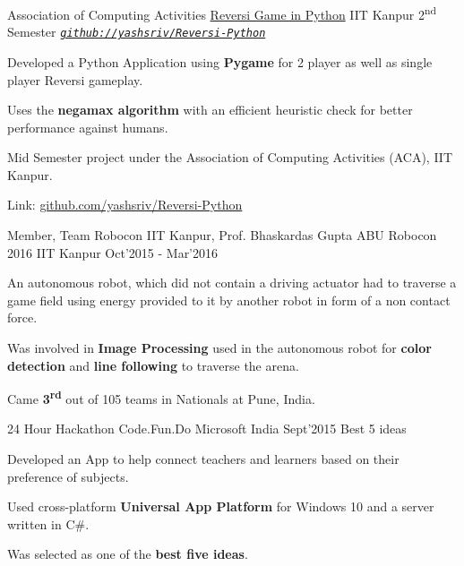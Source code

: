 \begin{cventries}
  \smallcventry
  {Association of Computing Activities}
  {\href{https://github.com/yashsriv/Reversi-Python}{Reversi Game in Python}}
  {IIT Kanpur}
  {2\textsuperscript{nd} Semester}
  {\emph{\texttt{\href{https://github.com/yashsriv/Reversi-Python}{github://yashsriv/Reversi-Python}}}}
  {
    \begin{cvitems}
    \item Developed a Python Application using \textbf{Pygame} for 2 player as well as
      single player Reversi gameplay.
    \item Uses the \textbf{negamax algorithm} with an efficient heuristic check
      for better performance against humans.
    \item Mid Semester project under the Association of Computing Activities (ACA), IIT Kanpur.
    \item Link: \href{https://github.com/yashsriv/Reversi-Python}{github.com/yashsriv/Reversi-Python}
    \end{cvitems}
  }

  \cventry
  {Member, Team Robocon IIT Kanpur\ifdefined\ONEPAGE\else, Prof. Bhaskardas Gupta\fi}
  {ABU Robocon 2016}
  {IIT Kanpur}
  {Oct'2015 - Mar'2016}
  {
    \begin{cvitems}
      \item An autonomous robot, which did not contain a driving actuator had to
        traverse a game field using energy provided to it by another robot in
        form of a non contact force.
      \item Was involved in \textbf{Image Processing} used in the autonomous
        robot for \textbf{color detection} and \textbf{line following}
        \ifdefined \ONEPAGE \else to traverse the arena. \fi
      \item Came \textbf{3\textsuperscript{rd}} out of 105 teams in Nationals at Pune, India.
    \end{cvitems}
  }

  \smallcventry
  {24 Hour Hackathon}
  {Code.Fun.Do}
  {Microsoft India}
  {Sept'2015}
  {Best 5 ideas}
  {
    \begin{cvitems}
    \item Developed an App to help connect teachers and learners based on their
      preference of subjects.
    \item Used cross-platform \textbf{Universal App Platform} for Windows 10
      and a server written in C\#.
    \item Was selected as one of the \textbf{best five ideas}.
    \end{cvitems}
  }

\end{cventries}
\vspace{-2mm}

